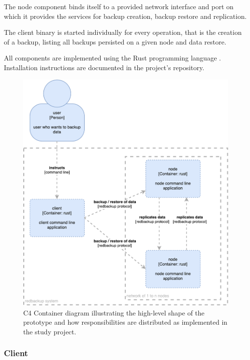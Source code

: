 The \gls{node} component binds itself to a provided network interface and port on which it provides the services for backup creation, backup restore and replication.

The \gls{client} binary is started individually for every operation, that is the creation of a backup, listing all backups persisted on a given \gls{node} and data restore.

All components are implemented using the Rust programming language \cite{rustlang-org}. Installation instructions are documented in the project's repository.

\begin{figure}[h]
	\centering
	\includegraphics[width=1\linewidth]{resources/c4-sa-container}
	\caption[SA specific C4 Container diagram]{C4 Container diagram illustrating the high-level shape of the prototype and how responsibilities are distributed as implemented in the study project.}
	\label{fig:c4-sa-container}
\end{figure}

\subsubsection{Client}


